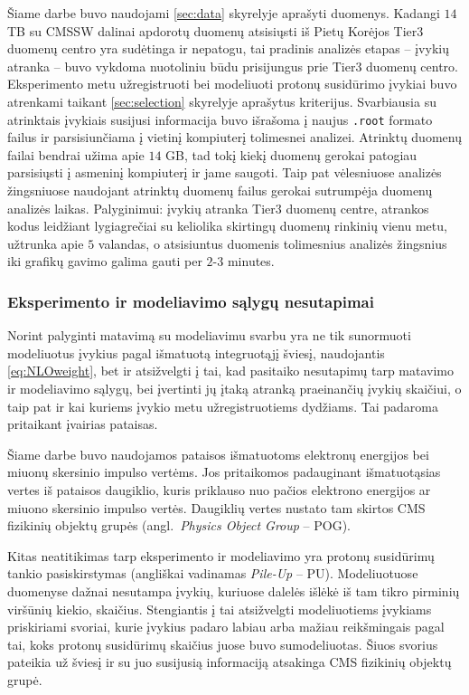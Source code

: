 \documentclass[a4paper, 12pt]{article}
\newcommand{\ttt}[1]{\texttt{#1}}
\newlength\q
\begin{document}
Šiame darbe buvo naudojami \ref{sec:data} skyrelyje aprašyti duomenys.
Kadangi $14$ TB su CMSSW dalinai apdorotų duomenų atsisiųsti iš Pietų Korėjos Tier3 duomenų centro yra sudėtinga ir nepatogu,
tai pradinis analizės etapas -- įvykių atranka -- buvo vykdoma nuotoliniu būdu prisijungus prie Tier3 duomenų centro.
Eksperimento metu užregistruoti bei modeliuoti protonų susidūrimo įvykiai buvo atrenkami taikant \ref{sec:selection}
skyrelyje aprašytus kriterijus.
Svarbiausia su atrinktais įvykiais susijusi informacija buvo išrašoma į naujus \ttt{.root} formato failus ir parsisiunčiama
į vietinį kompiuterį tolimesnei analizei.
Atrinktų duomenų failai bendrai užima apie $14$ GB, tad tokį kiekį duomenų gerokai patogiau parsisiųsti į asmeninį kompiuterį
ir jame saugoti.
Taip pat vėlesniuose analizės žingsniuose naudojant atrinktų duomenų failus gerokai sutrumpėja duomenų analizės laikas.
Palyginimui: įvykių atranka Tier3 duomenų centre, atrankos kodus leidžiant lygiagrečiai su keliolika skirtingų duomenų rinkinių
vienu metu, užtrunka apie $5$ valandas, o atsisiuntus duomenis tolimesnius analizės žingsnius iki grafikų gavimo galima gauti
per $2$-$3$ minutes.

\subsubsection{Eksperimento ir modeliavimo sąlygų nesutapimai}\label{sec:SFs}

Norint palyginti matavimą su modeliavimu svarbu yra ne tik sunormuoti modeliuotus įvykius pagal išmatuotą integruotąjį šviesį,
naudojantis \eqref{eq:NLOweight}, bet ir atsižvelgti į tai, kad pasitaiko nesutapimų tarp matavimo ir modeliavimo sąlygų,
bei įvertinti jų įtaką atranką praeinančių įvykių skaičiui, o taip pat ir kai kuriems įvykio metu užregistruotiems dydžiams.
Tai padaroma pritaikant įvairias pataisas.

Šiame darbe buvo naudojamos pataisos išmatuotoms elektronų energijos bei miuonų skersinio impulso vertėms.
Jos pritaikomos padauginant išmatuotąsias vertes iš pataisos daugiklio, kuris priklauso nuo pačios elektrono energijos ar miuono
skersinio impulso vertės.
Daugiklių vertes nustato tam skirtos CMS fizikinių objektų grupės (angl.\ \textit{Physics Object Group} -- POG).

Kitas neatitikimas tarp eksperimento ir modeliavimo yra protonų susidūrimų tankio pasiskirstymas (angliškai vadinamas
\textit{Pile-Up} -- PU).
Modeliuotuose duomenyse dažnai nesutampa įvykių, kuriuose dalelės išlėkė iš tam tikro pirminių viršūnių kiekio, skaičius.
Stengiantis į tai atsižvelgti modeliuotiems įvykiams priskiriami svoriai, kurie įvykius padaro labiau arba mažiau reikšmingais
pagal tai, koks protonų susidūrimų skaičius juose buvo sumodeliuotas.
Šiuos svorius pateikia už šviesį ir su juo susijusią informaciją atsakinga CMS fizikinių objektų grupė.
\end{document}
